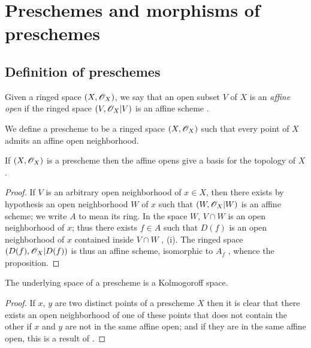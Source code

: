 \section{Preschemes and morphisms of preschemes}
\label{section-preschemes-and-morphisms}

\subsection{Definition of preschemes}
\label{subsection-preschemes-definition}

\begin{env}[2.1.1]
\label{1.2.1.1}
Given a ringed space $(X,\mathscr{O}_X)$, we say that an open subset
$V$ of $X$ is an {\em affine open} if the ringed space $(V,\mathscr{O}_X|V)$ is an
affine scheme .
\end{env}

\begin{defn}[2.1.2]
\label{1.2.1.2}
We define a prescheme to be a ringed space
$(X,\mathscr{O}_X)$ such that every point of $X$ admits an affine open neighborhood.
\end{defn}

\begin{prop}[2.1.3]
\label{1.2.1.3}
If $(X,\mathscr{O}_X)$ is a prescheme then the affine opens give a basis for the topology of $X$.
\end{prop}

\begin{proof}
\label{proof-1.2.1.3}
If $V$ is an arbitrary open neighborhood of $x\in X$, then there
exists by hypothesis an open neighborhood $W$ of $x$ such that $(W,\mathscr{O}_X|W)$ is
an affine scheme; we write $A$ to mean its ring. In the space $W$, $V\cap W$ is
an open neighborhood of $x$; thus there exists $f\in A$ such that $D(f)$ is an
open neighborhood of $x$ contained inside $V\cap W$ , (i).
The ringed space $(D(f),\mathscr{O}_X|D(f))$ is thus an affine scheme, isomorphic to $A_f$
, whence the proposition.
\end{proof}

\begin{prop}[2.1.4]
\label{1.2.1.4}
The underlying space of a prescheme is a Kolmogoroff space.
\end{prop}

\begin{proof}
\label{proof-1.2.1.4}
If $x$, $y$ are two distinct points of a prescheme $X$ then it is clear
that there exists an open neighborhood of one of these points that does not
contain the other if $x$ and $y$ are not in the same affine open; and if they
are in the same affine open, this is a result of .
\end{proof}

